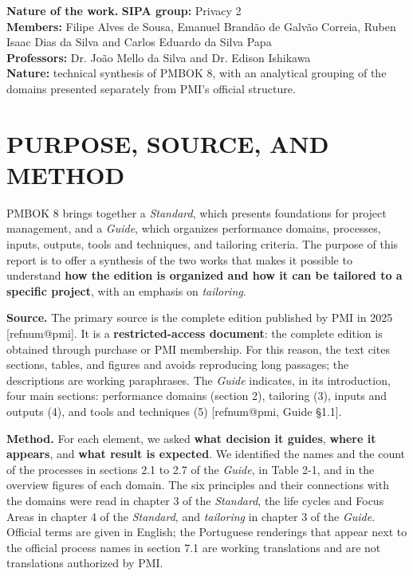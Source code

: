 \documentclass[12pt,a4paper,article,oneside,brazil,english]{abntex2}
\makeatletter
\newcommand{\refnum}[1]{\csname refnum@#1\endcsname}
\makeatother
\begin{document}
\setcounter{table}{0}
\begin{flushleft}\small\SingleSpacing
\noindent\textbf{Nature of the work.} \textbf{SIPA group:} Privacy 2\\ \textbf{Members:} Filipe Alves de Sousa, Emanuel Brandão de Galvão Correia, Ruben Isaac Dias da Silva and Carlos Eduardo da Silva Papa\\ \textbf{Professors:} Dr. João Mello da Silva and Dr. Edison Ishikawa\\ \textbf{Nature:} technical synthesis of PMBOK 8, with an analytical grouping of the domains presented separately from PMI's official structure.
\end{flushleft}
\vspace{\onelineskip}

\section{PURPOSE, SOURCE, AND METHOD}

PMBOK 8 brings together a \textit{Standard}, which presents foundations for project management, and a \textit{Guide}, which organizes performance domains, processes, inputs, outputs, tools and techniques, and tailoring criteria. The purpose of this report is to offer a synthesis of the two works that makes it possible to understand \textbf{how the edition is organized and how it can be tailored to a specific project}, with an emphasis on \textit{tailoring}.

\textbf{Source.} The primary source is the complete edition published by PMI in 2025 [\refnum{pmi}]. It is a \textbf{restricted-access document}: the complete edition is obtained through purchase or PMI membership. For this reason, the text cites sections, tables, and figures and avoids reproducing long passages; the descriptions are working paraphrases. The \textit{Guide} indicates, in its introduction, four main sections: performance domains (section 2), tailoring (3), inputs and outputs (4), and tools and techniques (5) [\refnum{pmi}, Guide §1.1].

\textbf{Method.} For each element, we asked \textbf{what decision it guides}, \textbf{where it appears}, and \textbf{what result is expected}. We identified the names and the count of the processes in sections 2.1 to 2.7 of the \textit{Guide}, in Table 2-1, and in the overview figures of each domain. The six principles and their connections with the domains were read in chapter 3 of the \textit{Standard}, the life cycles and Focus Areas in chapter 4 of the \textit{Standard}, and \textit{tailoring} in chapter 3 of the \textit{Guide}. Official terms are given in English; the Portuguese renderings that appear next to the official process names in section 7.1 are working translations and are not translations authorized by PMI.
\end{document}
